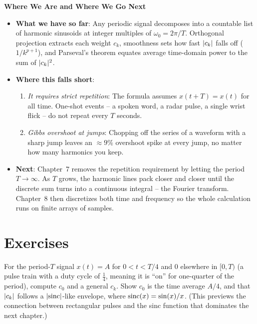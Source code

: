 \begin{connectionbox}
\textbf{Where We Are and Where We Go Next}
\begin{itemize}
  \item \textbf{What we have so far}: Any periodic signal decomposes into a countable list of
  harmonic sinusoids at integer multiples of $\omega_0 = 2\pi/T$. Orthogonal projection extracts
  each weight $c_k$, smoothness sets how fast $\lvert c_k\rvert$ falls off ($1/k^{p+1}$), and Parseval's
  theorem equates average time-domain power to the sum of $\lvert c_k\rvert^2$.
  \item \textbf{Where this falls short}:
  \begin{enumerate}
    \item \emph{It requires strict repetition}: The formula assumes $x(t+T) = x(t)$ for all time.
    One-shot events -- a spoken word, a radar pulse, a single wrist flick -- do not repeat every $T$
    seconds.
    \item \emph{Gibbs overshoot at jumps}: Chopping off the series of a waveform with a sharp jump
    leaves an $\approx 9\%$ overshoot spike at every jump, no matter how many harmonics you keep.
  \end{enumerate}
  \item \textbf{Next}: Chapter~7 removes the repetition requirement by letting the period $T \to \infty$.
  As $T$ grows, the harmonic lines pack closer and closer until the discrete sum turns into a
  continuous integral -- the Fourier transform. Chapter~8 then discretizes both time and frequency
  so the whole calculation runs on finite arrays of samples.
\end{itemize}
\end{connectionbox}

\section{Exercises}

\begin{exercise}
For the period-\(T\) signal \(x(t)=A\) for \(0<t<T/4\) and \(0\) elsewhere in
\([0,T)\) (a pulse train with a duty cycle of \(\tfrac14\), meaning it is ``on'' for one-quarter of the period), compute \(c_0\) and a general
\(c_k\). Show \(c_0\) is the time average \(A/4\), and that \(\lvert c_k\rvert\) follows a
\(\lvert\operatorname{sinc}\rvert\)-like envelope, where \(\operatorname{sinc}(x) = \sin(x)/x\). (This previews the connection between rectangular pulses and
the sinc function that dominates the next chapter.)
\end{exercise}

